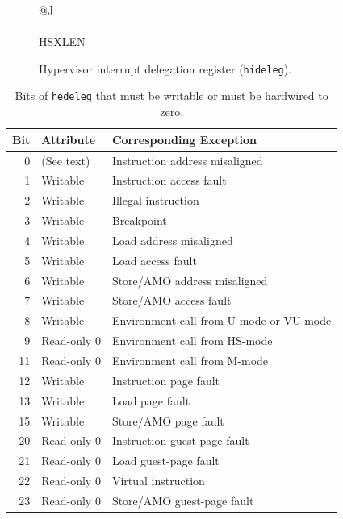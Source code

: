 \begin{figure}[h!]
{\footnotesize
\begin{center}
\begin{tabular}{@{}J}
 \\
\hline
{} \\
\hline
HSXLEN \\
\end{tabular}
\end{center}
}
\vspace{-0.1in}
\caption{Hypervisor interrupt delegation register ({\tt hideleg}).}
\label{hidelegreg}
\end{figure}

\begin{table}[h!]
\begin{center}
\begin{tabular}{|r|l|l|}
\hline
Bit & Attribute   & Corresponding Exception \\
\hline
 0  & (See text)  & Instruction address misaligned \\
 1  & Writable    & Instruction access fault \\
 2  & Writable    & Illegal instruction \\
 3  & Writable    & Breakpoint \\
 4  & Writable    & Load address misaligned \\
 5  & Writable    & Load access fault \\
 6  & Writable    & Store/AMO address misaligned \\
 7  & Writable    & Store/AMO access fault \\
 8  & Writable    & Environment call from U-mode or VU-mode \\
 9  & Read-only 0 & Environment call from HS-mode \\
11  & Read-only 0 & Environment call from M-mode \\
12  & Writable    & Instruction page fault \\
13  & Writable    & Load page fault \\
15  & Writable    & Store/AMO page fault \\
20  & Read-only 0 & Instruction guest-page fault \\
21  & Read-only 0 & Load guest-page fault \\
22  & Read-only 0 & Virtual instruction \\
23  & Read-only 0 & Store/AMO guest-page fault \\
\hline
\end{tabular}
\end{center}
\caption{Bits of {\tt hedeleg} that must be writable or must be hardwired
to zero.}
\label{tab:hedeleg-bits}
\end{table}

